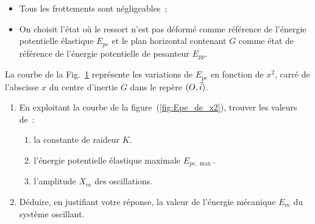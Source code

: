 \begin{donnees}
    \begin{itemize}
      \item Tous les frottements sont négligeables~;
      \item On choisit l'état où le ressort n'est pas déformé comme référence de
            l'énergie potentielle élastique $E_{pe}$ et le plan horizontal
            contenant $G$ comme état de référence de l'énergie potentielle de
            pesanteur $E_{pp}$.
    \end{itemize}
\end{donnees}
\begin{minipage}[t][][t]{0.68\linewidth}
    La courbe de la Fig.~\ref{fig:2bac_svt_national_2016_normale_phys_ex3_3}
    représente les variations de $E_{pe}$ en fonction de $x^{2}$, carré de
    l'abscisse $x$ du centre d'inertie $G$ dans le repère $(O,\vec{i})$.
    \begin{enumerate}
        \item En exploitant la courbe de la figure~(\ref{fig:Epe_de_x2}),
              trouver les valeurs de~:
              \begin{enumerate}
                  \item la constante de raideur $K$.
                  \item l'énergie potentielle élastique maximale $E_{pe,\max}$.
                  \item l'amplitude $X_{m}$ des oscillations.
              \end{enumerate}
        \item Déduire, en justifiant votre réponse, la valeur de l'énergie
              mécanique $E_{m}$ du système oscillant.
    \end{enumerate}
\end{minipage}
\hfill
\begin{minipage}[t][][t]{0.31\linewidth}
    \begin{figure}[H]
        \centering
        \caption{}
        \label{fig:2bac_svt_national_2016_normale_phys_ex3_3}
    \end{figure}
\end{minipage}
